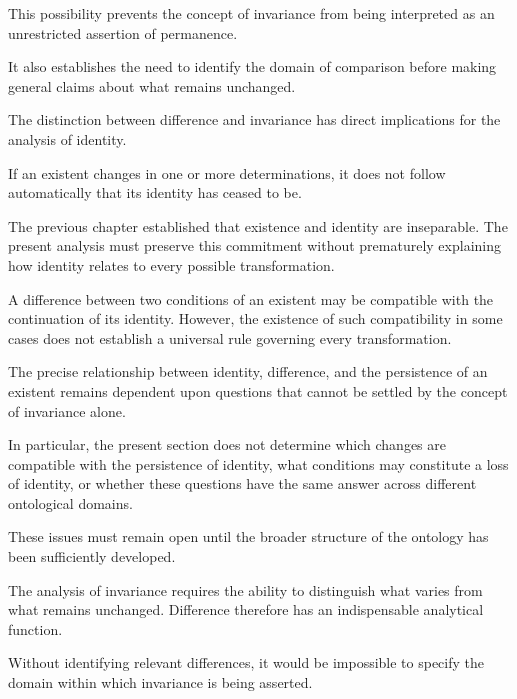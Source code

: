 This possibility prevents the concept of
invariance from being interpreted as an
unrestricted assertion of permanence.

It also establishes the need to identify
the domain of comparison before making
general claims about what remains unchanged.


The distinction between difference and
invariance has direct implications for
the analysis of identity.

If an existent changes in one or more
determinations, it does not follow automatically
that its identity has ceased to be.

The previous chapter established that
existence and identity are inseparable.
The present analysis must preserve this
commitment without prematurely explaining
how identity relates to every possible
transformation.

A difference between two conditions of
an existent may be compatible with the
continuation of its identity. However,
the existence of such compatibility in
some cases does not establish a universal
rule governing every transformation.

The precise relationship between identity,
difference, and the persistence of an
existent remains dependent upon questions
that cannot be settled by the concept of
invariance alone.

In particular, the present section does
not determine which changes are compatible
with the persistence of identity, what
conditions may constitute a loss of identity,
or whether these questions have the same
answer across different ontological domains.

These issues must remain open until the
broader structure of the ontology has
been sufficiently developed.


The analysis of invariance requires the
ability to distinguish what varies from
what remains unchanged. Difference therefore
has an indispensable analytical function.

Without identifying relevant differences,
it would be impossible to specify the
domain within which invariance is being
asserted.

